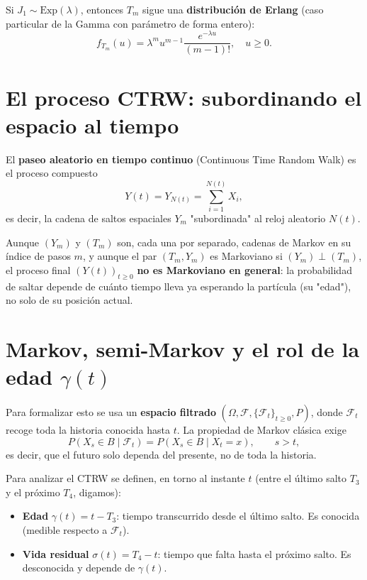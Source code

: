 \documentclass[10pt]{book}
\begin{document}
\begin{ejemplo}
Si $J_1\sim\mathrm{Exp}(\lambda)$, entonces $T_m$ sigue una \textbf{distribución de Erlang} (caso particular de la Gamma con parámetro de forma entero):
\begin{equation*}
    f_{T_m}(u) = \lambda^m u^{m-1}\frac{e^{-\lambda u}}{(m-1)!}, \quad u\ge 0.
\end{equation*}
\end{ejemplo}

\section{El proceso CTRW: subordinando el espacio al tiempo}

\begin{definicion}[CTRW]
El \textbf{paseo aleatorio en tiempo continuo} (Continuous Time Random Walk) es el proceso compuesto
\begin{equation*}
    Y(t) = Y_{N(t)} = \sum_{i=1}^{N(t)} X_i,
\end{equation*}
es decir, la cadena de saltos espaciales $Y_m$ "subordinada" al reloj aleatorio $N(t)$.
\end{definicion}

\begin{observacion}
Aunque $(Y_m)$ y $(T_m)$ son, cada una por separado, cadenas de Markov en su índice de pasos $m$, y aunque el par $(T_m,Y_m)$ es Markoviano si $(Y_m)\perp(T_m)$, el proceso final $(Y(t))_{t\ge0}$ \textbf{no es Markoviano en general}: la probabilidad de saltar depende de cuánto tiempo lleva ya esperando la partícula (su "edad"), no solo de su posición actual.
\end{observacion}

\section{Markov, semi-Markov y el rol de la edad $\gamma(t)$}

Para formalizar esto se usa un \textbf{espacio filtrado} $(\Omega,\mathcal{F},\{\mathcal{F}_t\}_{t\ge0},P)$, donde $\mathcal{F}_t$ recoge toda la historia conocida hasta $t$. La propiedad de Markov clásica exige
\begin{equation*}
    P(X_s\in B \mid \mathcal{F}_t) = P(X_s\in B \mid X_t=x), \qquad s>t,
\end{equation*}
es decir, que el futuro solo dependa del presente, no de toda la historia.

\noindent
Para analizar el CTRW se definen, en torno al instante $t$ (entre el último salto $T_3$ y el próximo $T_4$, digamos):
\begin{itemize}
    \item \textbf{Edad} $\gamma(t)=t-T_3$: tiempo transcurrido desde el último salto. Es conocida (medible respecto a $\mathcal{F}_t$).
    \item \textbf{Vida residual} $\sigma(t)=T_4-t$: tiempo que falta hasta el próximo salto. Es desconocida y depende de $\gamma(t)$.
\end{itemize}
\end{document}
